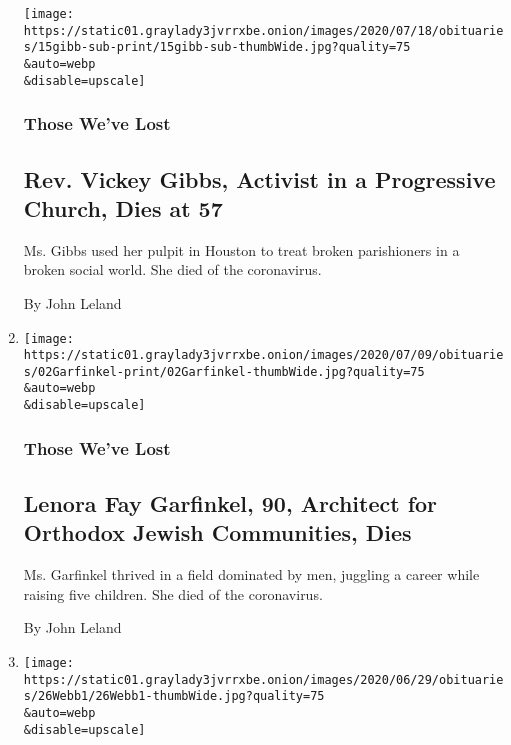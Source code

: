 \begin{enumerate}
  \texttt{[image: https://static01.graylady3jvrrxbe.onion/images/2020/07/18/obituaries/15gibb-sub-print/15gibb-sub-thumbWide.jpg?quality=75\\\&auto=webp\\\&disable=upscale]}

  \hypertarget{those-weve-lost-3}{%
  \subsubsection{Those We've Lost}\label{those-weve-lost-3}}

  \hypertarget{rev-vickey-gibbs-activist-in-a-progressive-church-dies-at-57}{%
  \subsection{Rev. Vickey Gibbs, Activist in a Progressive Church, Dies
  at
  57}\label{rev-vickey-gibbs-activist-in-a-progressive-church-dies-at-57}}

  Ms. Gibbs used her pulpit in Houston to treat broken parishioners in a
  broken social world. She died of the coronavirus.

  By John Leland
\item
  \href{/2020/07/03/obituaries/lenora-garfinkel-dead-coronavirus.html}{}

  \texttt{[image: https://static01.graylady3jvrrxbe.onion/images/2020/07/09/obituaries/02Garfinkel-print/02Garfinkel-thumbWide.jpg?quality=75\\\&auto=webp\\\&disable=upscale]}

  \hypertarget{those-weve-lost-4}{%
  \subsubsection{Those We've Lost}\label{those-weve-lost-4}}

  \hypertarget{lenora-fay-garfinkel-90-architect-for-orthodox-jewish-communities-dies}{%
  \subsection{Lenora Fay Garfinkel, 90, Architect for Orthodox Jewish
  Communities,
  Dies}\label{lenora-fay-garfinkel-90-architect-for-orthodox-jewish-communities-dies}}

  Ms. Garfinkel thrived in a field dominated by men, juggling a career
  while raising five children. She died of the coronavirus.

  By John Leland
\item
  \href{/2020/06/28/books/charles-webb-dead.html}{}

  \texttt{[image: https://static01.graylady3jvrrxbe.onion/images/2020/06/29/obituaries/26Webb1/26Webb1-thumbWide.jpg?quality=75\\\&auto=webp\\\&disable=upscale]}


\end{enumerate}
